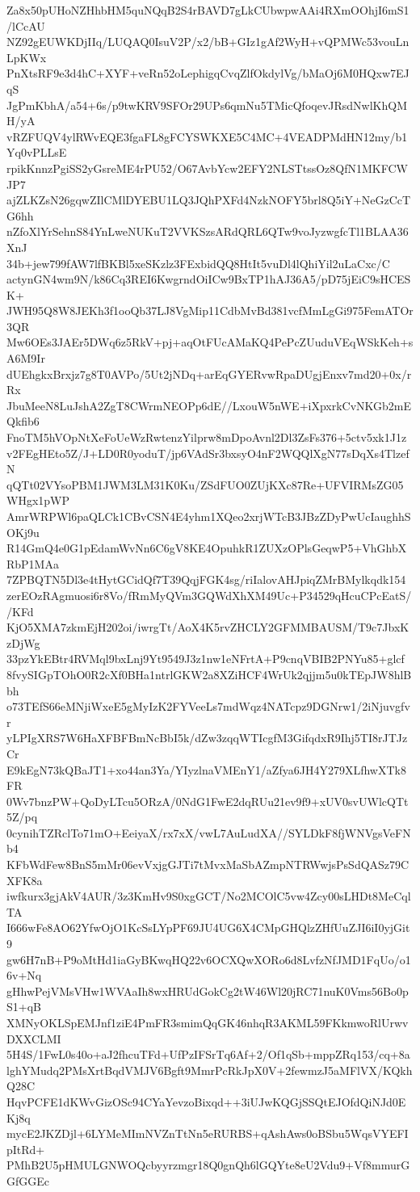 Za8x50pUHoNZHhbHM5quNQqB2S4rBAVD7gLkCUbwpwAAi4RXmOOhjI6mS1/lCcAU
NZ92gEUWKDjIIq/LUQAQ0IsuV2P/x2/bB+GIz1gAf2WyH+vQPMWc53vouLnLpKWx
PnXtsRF9e3d4hC+XYF+veRn52oLephigqCvqZlfOkdylVg/bMaOj6M0HQxw7EJqS
JgPmKbhA/a54+6s/p9twKRV9SFOr29UPs6qmNu5TMicQfoqevJRsdNwlKhQMH/yA
vRZFUQV4ylRWvEQE3fgaFL8gFCYSWKXE5C4MC+4VEADPMdHN12my/b1Yq0vPLLsE
rpikKnnzPgiSS2yGsreME4rPU52/O67AvbYcw2EFY2NLSTtssOz8QfN1MKFCWJP7
ajZLKZsN26gqwZIlCMlDYEBU1LQ3JQhPXFd4NzkNOFY5brl8Q5iY+NeGzCcTG6hh
nZfoXlYrSehnS84YnLweNUKuT2VVKSzsARdQRL6QTw9voJyzwgfcTl1BLAA36XnJ
34b+jew799fAW7lfBKBl5xeSKzlz3FExbidQQ8HtIt5vuDl4lQhiYil2uLaCxc/C
actynGN4wm9N/k86Cq3REI6KwgrndOiICw9BxTP1hAJ36A5/pD75jEiC9sHCESK+
JWH95Q8W8JEKh3f1ooQb37LJ8VgMip11CdbMvBd381vcfMmLgGi975FemATOr3QR
Mw6OEs3JAEr5DWq6z5RkV+pj+aqOtFUcAMaKQ4PePcZUuduVEqWSkKeh+sA6M9Ir
dUEhgkxBrxjz7g8T0AVPo/5Ut2jNDq+arEqGYERvwRpaDUgjEnxv7md20+0x/rRx
JbuMeeN8LuJshA2ZgT8CWrmNEOPp6dE//LxouW5nWE+iXpxrkCvNKGb2mEQkfib6
FnoTM5hVOpNtXeFoUeWzRwtenzYilprw8mDpoAvnl2Dl3ZsFs376+5ctv5xk1J1z
v2FEgHEto5Z/J+LD0R0yoduT/jp6VAdSr3bxsyO4nF2WQQlXgN77sDqXs4TlzefN
qQTt02VYsoPBM1JWM3LM31K0Ku/ZSdFUO0ZUjKXc87Re+UFVIRMsZG05WHgx1pWP
AmrWRPWl6paQLCk1CBvCSN4E4yhm1XQeo2xrjWTcB3JBzZDyPwUcIaughhSOKj9u
R14GmQ4e0G1pEdamWvNn6C6gV8KE4OpuhkR1ZUXzOPlsGeqwP5+VhGhbXRbP1MAa
7ZPBQTN5Dl3e4tHytGCidQf7T39QqjFGK4sg/riIalovAHJpiqZMrBMylkqdk154
zerEOzRAgmuosi6r8Vo/fRmMyQVm3GQWdXhXM49Uc+P34529qHcuCPcEatS//KFd
KjO5XMA7zkmEjH202oi/iwrgTt/AoX4K5rvZHCLY2GFMMBAUSM/T9c7JbxKzDjWg
33pzYkEBtr4RVMql9bxLnj9Yt9549J3z1nw1eNFrtA+P9cnqVBIB2PNYu85+glcf
8fvySIGpTOhO0R2cXf0BHa1ntrlGKW2a8XZiHCF4WrUk2qjjm5u0kTEpJW8hlBbh
o73TEfS66eMNjiWxeE5gMyIzK2FYVeeLs7mdWqz4NATcpz9DGNrw1/2iNjuvgfvr
yLPIgXRS7W6HaXFBFBmNcBbI5k/dZw3zqqWTIcgfM3GifqdxR9Ihj5TI8rJTJzCr
E9kEgN73kQBaJT1+xo44an3Ya/YIyzlnaVMEnY1/aZfya6JH4Y279XLfhwXTk8FR
0Wv7bnzPW+QoDyLTcu5ORzA/0NdG1FwE2dqRUu21ev9f9+xUV0svUWlcQTt5Z/pq
0cynihTZRclTo71mO+EeiyaX/rx7xX/vwL7AuLudXA//SYLDkF8fjWNVgsVeFNb4
KFbWdFew8BnS5mMr06evVxjgGJTi7tMvxMaSbAZmpNTRWwjsPsSdQASz79CXFK8a
iwfkurx3gjAkV4AUR/3z3KmHv9S0xgGCT/No2MCOlC5vw4Zcy00sLHDt8MeCqlTA
I666wFe8AO62YfwOjO1KcSsLYpPF69JU4UG6X4CMpGHQlzZHfUuZJI6iI0yjGit9
gw6H7nB+P9oMtHd1iaGyBKwqHQ22v6OCXQwXORo6d8LvfzNfJMD1FqUo/o16v+Nq
gHhwPejVMsVHw1WVAaIh8wxHRUdGokCg2tW46Wl20jRC71nuK0Vms56Bo0pS1+qB
XMNyOKLSpEMJnf1ziE4PmFR3smimQqGK46nhqR3AKML59FKkmwoRlUrwvDXXCLMI
5H4S/1FwL0s40o+aJ2fhcuTFd+UfPzIFSrTq6Af+2/Of1qSb+mppZRq153/cq+8a
lghYMudq2PMsXrtBqdVMJV6Bgft9MmrPcRkJpX0V+2fewmzJ5aMFlVX/KQkhQ28C
HqvPCFE1dKWvGizOSc94CYaYevzoBixqd++3iUJwKQGjSSQtEJOfdQiNJd0EKj8q
mycE2JKZDjl+6LYMeMImNVZnTtNn5eRURBS+qAshAws0oBSbu5WqsVYEFIpItRd+
PMhB2U5pHMULGNWOQcbyyrzmgr18Q0gnQh6lGQYte8eU2Vdu9+Vf8mmurGGfGGEc
